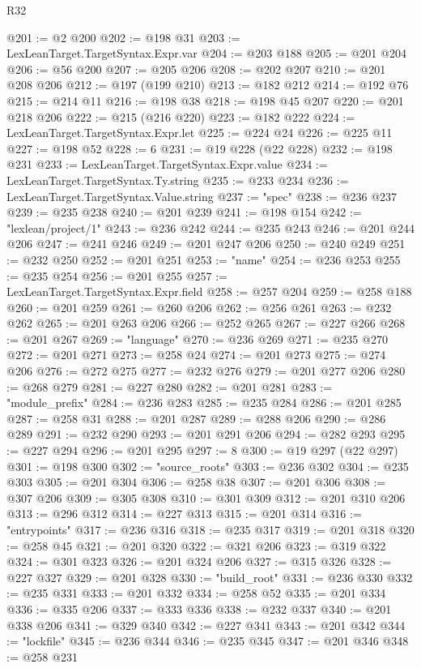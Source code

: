 \begin{lexlean}{R32}
\begin{coremodule}
@201 := @2 @200
@202 := @198 @31
@203 := LexLeanTarget.TargetSyntax.Expr.var
@204 := @203 @188
@205 := @201 @204
@206 := @56 @200
@207 := @205 @206
@208 := @202 @207
@210 := @201 @208 @206
@212 := @197 (@199 @210)
@213 := @182 @212
@214 := @192 @76
@215 := @214 @11
@216 := @198 @38
@218 := @198 @45 @207
@220 := @201 @218 @206
@222 := @215 (@216 @220)
@223 := @182 @222
@224 := LexLeanTarget.TargetSyntax.Expr.let
@225 := @224 @24
@226 := @225 @11
@227 := @198 @52
@228 := 6
@231 := @19 @228 (@22 @228)
@232 := @198 @231
@233 := LexLeanTarget.TargetSyntax.Expr.value
@234 := LexLeanTarget.TargetSyntax.Ty.string
@235 := @233 @234
@236 := LexLeanTarget.TargetSyntax.Value.string
@237 := "spec"
@238 := @236 @237
@239 := @235 @238
@240 := @201 @239
@241 := @198 @154
@242 := "lexlean/project/1"
@243 := @236 @242
@244 := @235 @243
@246 := @201 @244 @206
@247 := @241 @246
@249 := @201 @247 @206
@250 := @240 @249
@251 := @232 @250
@252 := @201 @251
@253 := "name"
@254 := @236 @253
@255 := @235 @254
@256 := @201 @255
@257 := LexLeanTarget.TargetSyntax.Expr.field
@258 := @257 @204
@259 := @258 @188
@260 := @201 @259
@261 := @260 @206
@262 := @256 @261
@263 := @232 @262
@265 := @201 @263 @206
@266 := @252 @265
@267 := @227 @266
@268 := @201 @267
@269 := "language"
@270 := @236 @269
@271 := @235 @270
@272 := @201 @271
@273 := @258 @24
@274 := @201 @273
@275 := @274 @206
@276 := @272 @275
@277 := @232 @276
@279 := @201 @277 @206
@280 := @268 @279
@281 := @227 @280
@282 := @201 @281
@283 := "module_prefix"
@284 := @236 @283
@285 := @235 @284
@286 := @201 @285
@287 := @258 @31
@288 := @201 @287
@289 := @288 @206
@290 := @286 @289
@291 := @232 @290
@293 := @201 @291 @206
@294 := @282 @293
@295 := @227 @294
@296 := @201 @295
@297 := 8
@300 := @19 @297 (@22 @297)
@301 := @198 @300
@302 := "source_roots"
@303 := @236 @302
@304 := @235 @303
@305 := @201 @304
@306 := @258 @38
@307 := @201 @306
@308 := @307 @206
@309 := @305 @308
@310 := @301 @309
@312 := @201 @310 @206
@313 := @296 @312
@314 := @227 @313
@315 := @201 @314
@316 := "entrypoints"
@317 := @236 @316
@318 := @235 @317
@319 := @201 @318
@320 := @258 @45
@321 := @201 @320
@322 := @321 @206
@323 := @319 @322
@324 := @301 @323
@326 := @201 @324 @206
@327 := @315 @326
@328 := @227 @327
@329 := @201 @328
@330 := "build_root"
@331 := @236 @330
@332 := @235 @331
@333 := @201 @332
@334 := @258 @52
@335 := @201 @334
@336 := @335 @206
@337 := @333 @336
@338 := @232 @337
@340 := @201 @338 @206
@341 := @329 @340
@342 := @227 @341
@343 := @201 @342
@344 := "lockfile"
@345 := @236 @344
@346 := @235 @345
@347 := @201 @346
@348 := @258 @231

\end{coremodule}
\end{lexlean}
